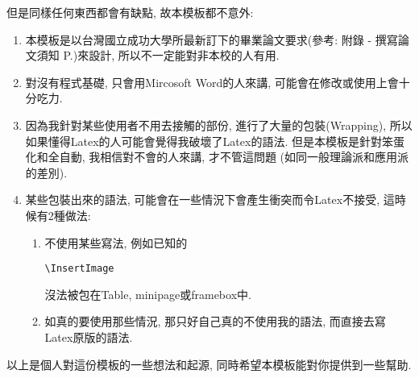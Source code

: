 但是同樣任何東西都會有缺點, 故本模板都不意外:

\begin{enumerate}

  \item
  {
    本模板是以台灣國立成功大學所最新訂下的畢業論文要求(參考: 附錄 - 撰寫論文須知 P.)來設計, 所以不一定能對非本校的人有用.
  } %

  \item
  {
    對沒有程式基礎, 只會用Mircosoft Word的人來講, 可能會在修改或使用上會十分吃力.
  } %

  \item
  {
    因為我針對某些使用者不用去接觸的部份, 進行了大量的包裝(Wrapping), 所以如果懂得Latex的人可能會覺得我破壞了Latex的語法. 但是本模板是針對笨蛋化和全自動, 我相信對不會的人來講, 才不管這問題 (如同一般理論派和應用派的差別).
  } %

  \item
  {
    某些包裝出來的語法, 可能會在一些情況下會產生衝突而令Latex不接受, 這時候有2種做法:
    \begin{enumerate}
      \item
      {
        不使用某些寫法, 例如已知的\begin{verbatim}\InsertImage\end{verbatim}沒法被包在Table, minipage或framebox中.
      } %

      \item
      {
        如真的要使用那些情況, 那只好自己真的不使用我的語法, 而直接去寫Latex原版的語法.
      } %
    \end{enumerate}
  } %
\end{enumerate}



以上是個人對這份模板的一些想法和起源, 同時希望本模板能對你提供到一些幫助.

\EndChapter
